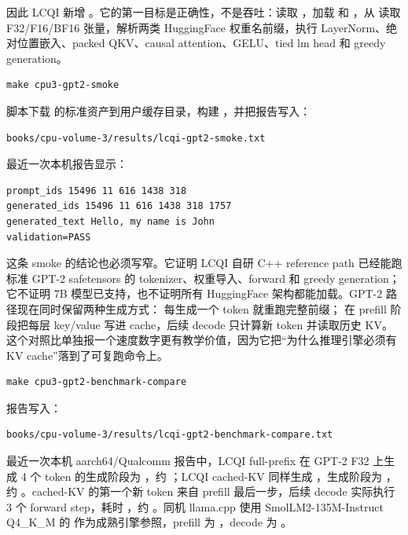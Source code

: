 因此 LCQI 新增 。它的第一目标是正确性，不是吞吐：读取 ，加载  和 ，从  读取 F32/F16/BF16 张量，解析两类 HuggingFace 权重名前缀，执行 LayerNorm、绝对位置嵌入、packed QKV、causal attention、GELU、tied lm head 和 greedy generation。

\begin{lstlisting}[numbers=none,caption={运行 LCQI 自研 GPT-2 smoke}]
make cpu3-gpt2-smoke
\end{lstlisting}

脚本下载  的标准资产到用户缓存目录，构建 ，并把报告写入：

\begin{lstlisting}[numbers=none,caption={GPT-2 smoke 报告路径}]
books/cpu-volume-3/results/lcqi-gpt2-smoke.txt
\end{lstlisting}

最近一次本机报告显示：

\begin{lstlisting}[numbers=none,caption={GPT-2 smoke 关键输出}]
prompt_ids 15496 11 616 1438 318
generated_ids 15496 11 616 1438 318 1757
generated_text Hello, my name is John
validation=PASS
\end{lstlisting}

这条 smoke 的结论也必须写窄。它证明 LCQI 自研 C++ reference path 已经能跑标准 GPT-2 safetensors 的 tokenizer、权重导入、forward 和 greedy generation；它不证明 7B 模型已支持，也不证明所有 HuggingFace 架构都能加载。GPT-2 路径现在同时保留两种生成方式： 每生成一个 token 就重跑完整前缀； 在 prefill 阶段把每层 key/value 写进 cache，后续 decode 只计算新 token 并读取历史 KV。这个对照比单独报一个速度数字更有教学价值，因为它把“为什么推理引擎必须有 KV cache”落到了可复跑命令上。

\begin{lstlisting}[numbers=none,caption={运行 GPT-2 full-prefix、cached-KV 和外部引擎对比}]
make cpu3-gpt2-benchmark-compare
\end{lstlisting}

报告写入：

\begin{lstlisting}[numbers=none,caption={GPT-2 benchmark 对比报告路径}]
books/cpu-volume-3/results/lcqi-gpt2-benchmark-compare.txt
\end{lstlisting}

最近一次本机 aarch64/Qualcomm 报告中，LCQI full-prefix 在 GPT-2 F32 上生成 4 个 token 的生成阶段为 ，约 ；LCQI cached-KV 同样生成 ，生成阶段为 ，约 。cached-KV 的第一个新 token 来自 prefill 最后一步，后续 decode 实际执行 3 个 forward step，耗时 ，约 。同机 llama.cpp 使用 SmolLM2-135M-Instruct Q4\_K\_M 的  作为成熟引擎参照，prefill 为 ，decode 为 。

